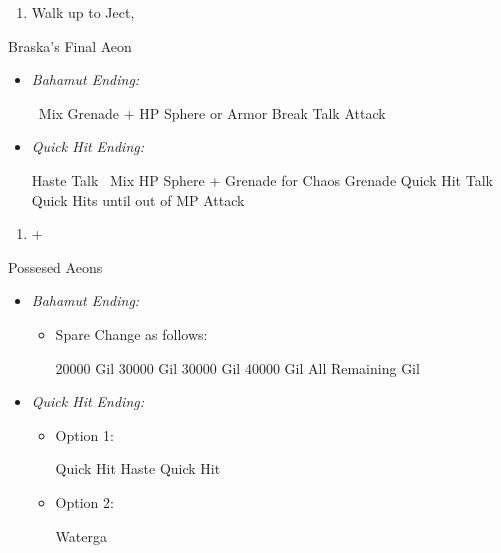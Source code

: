\begin{multicols}{2}
\begin{enumerate}[resume]
	\item Walk up to Ject, \cs[4:30]
\end{enumerate}
\begin{battle}[180000]{Braska's Final Aeon}
\begin{itemize}
	\item \textit{Bahamut Ending:}
	\begin{itemize}
		\switch{\yuna}{\rikku}
		\rikkuf \od\ Mix Grenade + HP Sphere or Armor Break
		\tidusf Talk
		\switch{\auron}{\yuna}
		\summon{\bahamut}
		\bahamutf Attack
	\end{itemize}
	\item \textit{Quick Hit Ending:}
	\begin{itemize}
		\yunaf Haste \yuna
		\tidusf Talk
		\switch{\auron}{\rikku}
		\rikkuf \od\ Mix HP Sphere + Grenade for Chaos Grenade
		\yunaf Quick Hit
		\tidusf Talk
		\yunaf Quick Hits until out of MP
		\summon{\bahamut}
		\bahamutf Attack
	\end{itemize}
\end{itemize}
\end{battle}
\begin{enumerate}[resume]
	\item \cs+\skippablefmv[4:00]
\end{enumerate}
\begin{battle}{Possesed Aeons}
\begin{itemize}
	\item \textit{Bahamut Ending:}
	\begin{itemize}
		\item Spare Change as follows:
		\begin{itemize}
			\valeforf \num{20000} Gil
			\ifritf \num{30000} Gil
			\ixilonf \num{30000} Gil
			\bahamutf \num{40000} Gil
			\shivaf All Remaining Gil
		\end{itemize}
	\end{itemize}
	\item \textit{Quick Hit Ending:}
	\begin{itemize}
		\yunaf Elixer \yuna
		\item Option 1:
		\begin{itemize}
			\yunaf Quick Hit
			\yunaf Haste \yuna
			\yunaf Quick Hit
		\end{itemize}
		\item Option 2:
		\begin{itemize}
			\valeforf Waterga

\end{itemize}
\end{itemize}
\end{itemize}
\end{battle}
\end{multicols}
